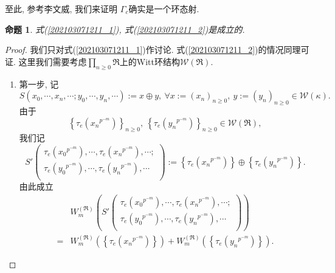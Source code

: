 \documentclass[UTF8, twoside]{ctexart}
\theoremstyle{nonumberplain}
\newtheorem{proof}{\heiti 证明}  %
\theoremstyle{nonumberplain}
\theoremstyle{plain}
\newtheorem{mingti4}[dingyi4]{命题}
\begin{document}
	\quad 
	至此, 参考李文威\cite[定理10.9.11]{liwenwei}, 我们来证明
	$\Gamma_c$确实是一个环态射.
	\begin{mingti4}
		式(\ref{202103071211_1}),  式(\ref{202103071211_2})是成立的.
	\end{mingti4}
	\begin{proof}
		我们只对式(\ref{202103071211_1})作讨论. 
		式(\ref{202103071211_2})的情况同理可证.
		这里我们需要考虑$\prod_{n\ge 0}^{{}}{\Re }$上的Witt环结构$\mathcal{W}\left( \Re  \right)$.
		\vskip 0.3cm
		\begin{enumerate}
			\item 第一步, 记
			\[
				S\left( {{x}_{0}},\cdots ,{{x}_{n}},\cdots ;{{y}_{0}},\cdots ,{{y}_{n}},\cdots  \right):=x\oplus y,\ \forall x:={{\left( {{x}_{n}} \right)}_{n\ge 0}},\ y:={{\left( {{y}_{n}} \right)}_{n\ge 0}}\in \mathcal{W}\left( \kappa  \right).
			\]
			由于
			\[
				{{\left\{ {{\tau }_{e}}\left( {{x}_{n}}^{{{p}^{-m}}} \right) \right\}}_{n\ge 0}},\ {{\left\{ {{\tau }_{e}}\left( {{y}_{n}}^{{{p}^{-m}}} \right) \right\}}_{n\ge 0}}\in \mathcal{W}\left( \Re  \right),
			\]
			我们记
			\[S'\left( \begin{matrix}
				{{\tau }_{e}}\left( {{x}_{0}}^{{{p}^{-m}}} \right),\cdots ,{{\tau }_{e}}\left( {{x}_{n}}^{{{p}^{-m}}} \right),\cdots ;  \\
				{{\tau }_{e}}\left( {{y}_{0}}^{{{p}^{-m}}} \right),\cdots ,{{\tau }_{e}}\left( {{y}_{n}}^{{{p}^{-m}}} \right),\cdots   \\
			\end{matrix} \right):=\left\{ {{\tau }_{e}}\left( {{x}_{n}}^{{{p}^{-m}}} \right) \right\}\oplus \left\{ {{\tau }_{e}}\left( {{y}_{n}}^{{{p}^{-m}}} \right) \right\}.\]
			由此成立
			\begin{subequations} \label{goal_1}
			\begin{align}
				& W_{m}^{\left( \Re  \right)}\left( S'\left( \begin{matrix}
					{{\tau }_{e}}\left( {{x}_{0}}^{{{p}^{-m}}} \right),\cdots ,{{\tau }_{e}}\left( {{x}_{n}}^{{{p}^{-m}}} \right),\cdots ; \\
					{{\tau }_{e}}\left( {{y}_{0}}^{{{p}^{-m}}} \right),\cdots ,{{\tau }_{e}}\left( {{y}_{n}}^{{{p}^{-m}}} \right),\cdots \\
				\end{matrix} \right) \right)
				\label{goal_1.1} \\ 
				=&W_{m}^{\left( \Re  \right)}\left( \left\{ {{\tau }_{e}}\left( {{x}_{n}}^{{{p}^{-m}}} \right) \right\} \right)+W_{m}^{\left( \Re  \right)}\left( \left\{ {{\tau }_{e}}\left( {{y}_{n}}^{{{p}^{-m}}} \right) \right\} \right).
				\label{goal_1.2}
			\end{align}
			\end{subequations}
			\vskip 0.3cm
			

\end{enumerate}
\end{proof}
\end{document}
